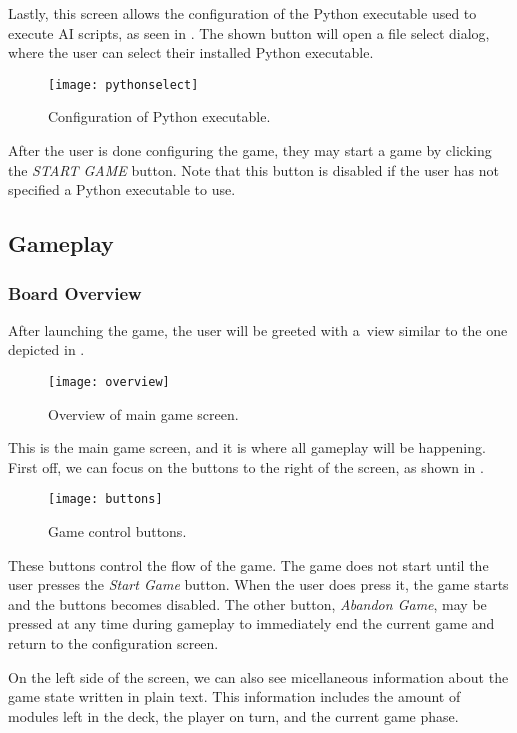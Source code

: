 Lastly, this screen allows the configuration of the Python executable used
to execute AI scripts, as seen in . The shown
button will open a file select dialog, where the user can select their
installed Python executable.

\begin{figure}[ht]
\centerline{\mbox{\texttt{[image: pythonselect]}}}
\caption{Configuration of Python executable.}\label{ud:pythonselect}
\end{figure}

After the user is done configuring the game, they may start a game by clicking the
\emph{START GAME} button. Note that this button is disabled if the user
has not specified a Python executable to use.

\subsection{Gameplay}
\subsubsection{Board Overview}

After launching the game, the user will be greeted with a~view similar to
the one depicted in .

\begin{figure}[ht]
\centerline{\mbox{\texttt{[image: overview]}}}
\caption{Overview of main game screen.}\label{ud:overview}
\end{figure}

This is the main game screen, and it is where all gameplay will be happening.
First off, we can focus on the buttons to the right of the screen, as shown in
.

\begin{figure}[ht]
\centerline{\mbox{\texttt{[image: buttons]}}}
\caption{Game control buttons.}\label{ud:buttons}
\end{figure}

These buttons control the flow of the game. The game does not start until the user
presses the \emph{Start Game} button. When the user does press it, the game starts
and the buttons becomes disabled. The other button, \emph{Abandon Game}, may be
pressed at any time during gameplay to immediately end the current game and return
to the configuration screen.

On the left side of the screen, we can also see micellaneous information about the
game state written in plain text. This information includes the amount of modules
left in the deck, the player on turn, and the current game phase.

